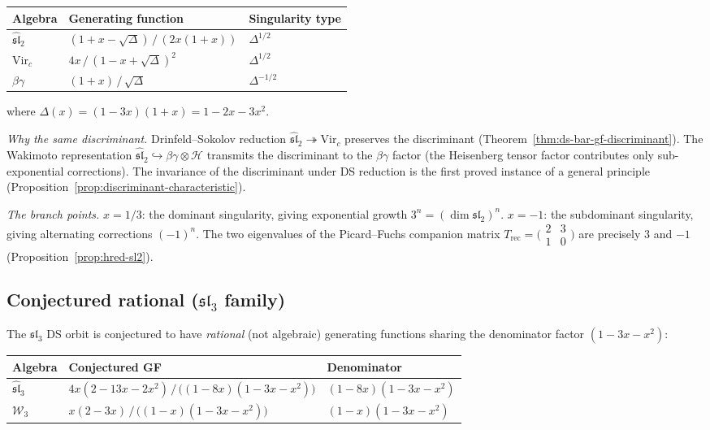 \begin{center}
\renewcommand{\arraystretch}{1.4}
\begin{tabular}{lll}
\toprule
\textbf{Algebra} & \textbf{Generating function} & \textbf{Singularity type} \\
\midrule
$\widehat{\mathfrak{sl}}_2$ & $(1+x-\sqrt{\Delta})\,/\,(2x(1+x))$ & $\Delta^{1/2}$ \\
$\mathrm{Vir}_c$ & $4x\,/\,(1-x+\sqrt{\Delta})^2$ & $\Delta^{1/2}$ \\
$\beta\gamma$ & $(1+x)\,/\,\sqrt{\Delta}$ & $\Delta^{-1/2}$ \\
\bottomrule
\end{tabular}
\end{center}
where $\Delta(x) = (1-3x)(1+x) = 1-2x-3x^2$.

\emph{Why the same discriminant.}
Drinfeld--Sokolov reduction $\widehat{\mathfrak{sl}}_2 \twoheadrightarrow \mathrm{Vir}_c$ preserves the discriminant (Theorem~\ref{thm:ds-bar-gf-discriminant}).  The Wakimoto representation $\widehat{\mathfrak{sl}}_2 \hookrightarrow \beta\gamma \otimes \mathcal{H}$ transmits the discriminant to the $\beta\gamma$ factor (the Heisenberg tensor factor contributes only sub-exponential corrections).  The invariance of the discriminant under DS reduction is the first proved instance of a general principle (Proposition~\ref{prop:discriminant-characteristic}).

\emph{The branch points.}
$x = 1/3$: the dominant singularity, giving exponential growth $3^n = (\dim\mathfrak{sl}_2)^n$.  $x = -1$: the subdominant singularity, giving alternating corrections $(-1)^n$.  The two eigenvalues of the Picard--Fuchs companion matrix $T_{\mathrm{rec}} = \bigl(\begin{smallmatrix} 2 & 3 \\ 1 & 0 \end{smallmatrix}\bigr)$ are precisely $3$ and $-1$ (Proposition~\ref{prop:hred-sl2}).

\subsection{Conjectured rational ($\mathfrak{sl}_3$ family)}
\label{subsec:gf-sl3-family}

The $\mathfrak{sl}_3$ DS orbit is conjectured to have \emph{rational} (not algebraic) generating functions sharing the denominator factor $(1-3x-x^2)$:

\begin{center}
\renewcommand{\arraystretch}{1.4}
\begin{tabular}{lll}
\toprule
\textbf{Algebra} & \textbf{Conjectured GF} & \textbf{Denominator} \\
\midrule
$\widehat{\mathfrak{sl}}_3$ & $4x(2-13x-2x^2)\,/\,\bigl((1-8x)(1-3x-x^2)\bigr)$ & $(1-8x)(1-3x-x^2)$ \\
$\mathcal{W}_3$ & $x(2-3x)\,/\,\bigl((1-x)(1-3x-x^2)\bigr)$ & $(1-x)(1-3x-x^2)$ \\
\bottomrule
\end{tabular}
\end{center}

